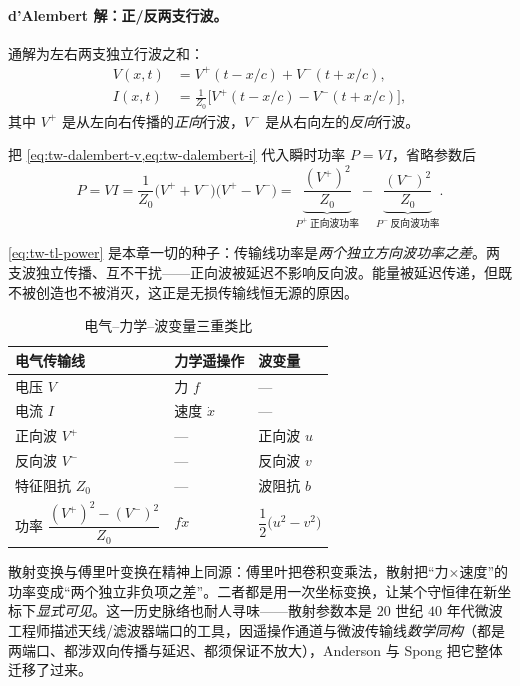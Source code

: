 \paragraph{d'Alembert 解：正/反两支行波。}
通解为左右两支独立行波之和\cite{anderson1989bilateral}：
\begin{align}
  V(x,t)&=V^+(t-x/c)+V^-(t+x/c),\label{eq:tw-dalembert-v}\\
  I(x,t)&=\tfrac{1}{Z_0}\big[V^+(t-x/c)-V^-(t+x/c)\big],\label{eq:tw-dalembert-i}
\end{align}
其中 $V^+$ 是从左向右传播的\emph{正向}行波，$V^-$ 是从右向左的\emph{反向}行波。

\begin{derivation}
把 \cref{eq:tw-dalembert-v,eq:tw-dalembert-i} 代入瞬时功率 $P=VI$，省略参数后
\begin{equation}
  P=VI=\frac{1}{Z_0}\big(V^++V^-\big)\big(V^+-V^-\big)
   =\underbrace{\frac{(V^+)^2}{Z_0}}_{P^+\ \text{正向波功率}}-\underbrace{\frac{(V^-)^2}{Z_0}}_{P^-\ \text{反向波功率}}.
  \label{eq:tw-tl-power}
\end{equation}
\end{derivation}

\cref{eq:tw-tl-power} 是本章一切的种子：传输线功率是\emph{两个独立方向波功率之差}。两支波独立传播、互不干扰——正向波被延迟不影响反向波。能量被延迟传递，但既不被创造也不被消灭，这正是无损传输线恒无源的原因。

\begin{table}[H]\centering\small
\caption{电气--力学--波变量三重类比}
\label{tab:tw-analogy}
\begin{tabular}{lll}
\toprule
电气传输线 & 力学遥操作 & 波变量 \\
\midrule
电压 $V$ & 力 $f$ & --- \\
电流 $I$ & 速度 $\dot x$ & --- \\
正向波 $V^+$ & --- & 正向波 $u$ \\
反向波 $V^-$ & --- & 反向波 $v$ \\
特征阻抗 $Z_0$ & --- & 波阻抗 $b$ \\
功率 $\dfrac{(V^+)^2-(V^-)^2}{Z_0}$ & $f\dot x$ & $\dfrac12\big(u^2-v^2\big)$ \\
\bottomrule
\end{tabular}
\end{table}

\begin{insight}
散射变换与傅里叶变换在精神上同源：傅里叶把卷积变乘法，散射把“力$\times$速度”的功率变成“两个独立非负项之差”。二者都是用一次坐标变换，让某个守恒律在新坐标下\emph{显式可见}。这一历史脉络也耐人寻味——散射参数本是 $20$ 世纪 $40$ 年代微波工程师描述天线/滤波器端口的工具，因遥操作通道与微波传输线\emph{数学同构}（都是两端口、都涉双向传播与延迟、都须保证不放大），Anderson 与 Spong 把它整体迁移了过来。
\end{insight}


